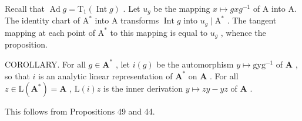 Recall that \(\operatorname{Ad} g = \mathrm{T}_{1}(\operatorname{Int} g)\) . Let \(u_{g}\) be the mapping \(x \mapsto gxg^{-1}\) of A into A. The identity chart of \(\mathrm{A}^{*}\) into A transforms \(\operatorname{Int} g\) into \(u_{g} \mid \mathrm{A}^{*}\) . The tangent mapping at each point of \(\mathrm{A}^{*}\) to this mapping is equal to \(u_{g}\) , whence the proposition.

COROLLARY. For all \(g \in \mathbf{A}^*\) , let \(i(g)\) be the automorphism \(y \mapsto \mathrm{gyg}^{-1}\) of \(\mathbf{A}\) , so that \(i\) is an analytic linear representation of \(\mathbf{A}^*\) on \(\mathbf{A}\) . For all \(z \in \mathrm{L}(\mathbf{A}^*) = \mathbf{A}\) , \(\mathrm{L}(i)z\) is the inner derivation \(y \mapsto zy - yz\) of \(\mathbf{A}\) .

This follows from Propositions 49 and 44.


